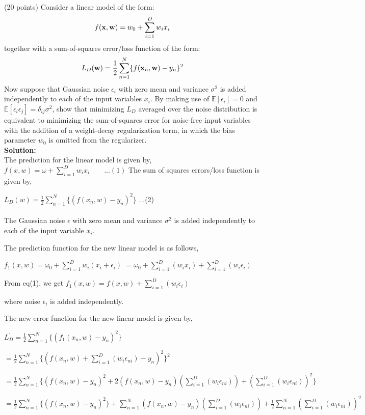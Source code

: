 \documentclass{exam}
\newcommand{\xx}{{\bf{x}}}
\newcommand{\ww}{{\bf{w}}}
\begin{document}
\begin{questions}
\newpage
{} (20 points) Consider a linear model of the form:
$$f(\xx,\ww) = w_0 + \sum_{i=1}^D w_i x_i$$
together with a sum-of-squares error/loss function of the form:
$$L_D(\ww) = \frac{1}{2} \sum_{n=1}^N \{f(\xx_n,\ww) - y_n\}^2$$
Now suppose that Gaussian noise $\epsilon_i$ with zero mean and variance $\sigma^2$ is added independently to each of the input variables $x_i$. By making use of $\mathbb{E}[\epsilon_i]=0$ and $\mathbb{E}[\epsilon_i\epsilon_j]=\delta_{ij} \sigma^2$, show that minimizing $L_D$ averaged over the noise distribution is equivalent to minimizing the sum-of-squares error
for noise-free input variables with the addition of a weight-decay regularization term, in which the bias parameter $w_0$ is omitted from the regularizer.\\
\textbf{Solution:}\\
The prediction for the linear model is given by,
$f(x,w) = \omega + \sum_{i=1}^{D} w_{i}x_{i}\quad \quad ...(1)$
The sum of squares errors/loss function is given by,

$L_{D}(w) = \frac{1}{2} \sum_{n=1}^{N} \{ (f(x_{n},w)-y_{n})^2 \}$ \quad \quad ...(2)\\\\
The Gaussian noise $\epsilon$ with zero mean and variance $\sigma^{2}$ is added independently to each of the input variable $x_{i}$.

The prediction function for the new linear model is as follows,

$f_{1}(x,w) =\omega_{0} + \sum_{i=1}^{D} w_{i}(x_{i}+\epsilon_{i})$
$=\omega_{0} + \sum_{i=1}^{D} (w_{i}x_{i})+\sum_{i=1}^{D}(w_{i}\epsilon_{i})$


From eq(1), we get
$f_{1}(x,w) = f(x,w)+\sum_{i=1}^{D}(w_{i}\epsilon_{i})$

where noise $\epsilon_{i}$ is added independently.

The new error function for the new linear model is given by,

$L_{D}^{'} = \frac{1}{2}\sum_{n=1}^{N}\{ (f_{1}(x_{n},w)-y_{n})^2 \}$

$= \frac{1}{2}\sum_{n=1}^{N}\{ (f(x_{n},w)+\sum_{i=1}^{D}(w_{i}\epsilon_{ni})-y_{n})^2 \}^2$

$= \frac{1}{2}\sum_{n=1}^{N}\{ (f(x_{n},w) - y_{n})^2 + 2(f(x_{n},w) -y_{n})(\sum_{i=1}^{D}(w_{i}\epsilon_{ni})) + (\sum_{i=1}^{D}(w_{i}\epsilon_{ni}))^2 \}$

$=\frac{1}{2}\sum_{n=1}^{N}\{ (f(x_{n},w) - y_{n})^2 \}+ \sum_{n=1}^{N}(f(x_{n},w) -y_{n})(\sum_{i=1}^{D}(w_{i}\epsilon_{ni})) +\frac{1}{2}\sum_{n=1}^{N} (\sum_{i=1}^{D}(w_{i}\epsilon_{ni}))^2$


\end{questions}
\end{document}
